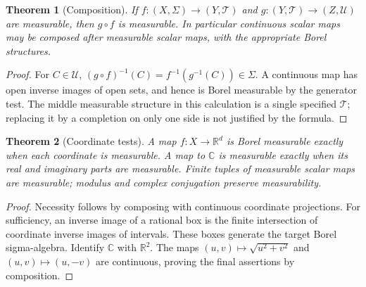 \documentclass[11pt,oneside,openany]{book}
\newtheorem{theorem}{Theorem}[chapter]
\theoremstyle{definition}
\theoremstyle{remark}
\newcommand{\R}{\mathbb R}\newcommand{\C}{\mathbb C}
\newcommand{\family}[1]{}
\begin{document}
\begin{theorem}[Composition]
\family{D11.04.composition}\label{d11:04:composition}
If $f:(X,\Sigma)\to(Y,\mathcal T)$ and
$g:(Y,\mathcal T)\to(Z,\mathcal U)$ are measurable, then $g\circ f$ is
measurable. In particular continuous scalar maps may be composed after
measurable scalar maps, with the appropriate Borel structures.
\end{theorem}
\begin{proof}
For $C\in\mathcal U$,
$(g\circ f)^{-1}(C)=f^{-1}(g^{-1}(C))\in\Sigma$.
A continuous map has open inverse images of open sets, and hence is Borel
measurable by the generator test. The middle measurable structure in this
calculation is a single specified $\mathcal T$; replacing it by a completion
on only one side is not justified by the formula.
\end{proof}

\begin{theorem}[Coordinate tests]
\family{D11.04.coordinates_complex}\label{d11:04:coordinates-complex}
A map $f:X\to\R^d$ is Borel measurable exactly when each coordinate is
measurable. A map to $\C$ is measurable exactly when its real and imaginary
parts are measurable. Finite tuples of measurable scalar maps are measurable;
modulus and complex conjugation preserve measurability.
\end{theorem}
\begin{proof}
Necessity follows by composing with continuous coordinate projections.
For sufficiency, an inverse image of a rational box is the finite
intersection of coordinate inverse images of intervals. These boxes generate
the target Borel sigma-algebra. Identify $\C$ with $\R^2$.
The maps $(u,v)\mapsto\sqrt{u^2+v^2}$ and $(u,v)\mapsto(u,-v)$ are
continuous, proving the final assertions by composition.
\end{proof}
\end{document}
